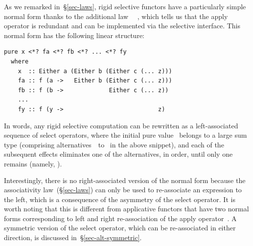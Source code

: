 As we remarked in~\S\ref{sec-laws}, rigid selective functors have a particularly
simple normal form thanks to the additional law \hs{(<*>)}~\hs{=}~,
which tells us that the apply operator \hs{<*>} is redundant and can be
implemented via the selective interface. This normal form has the following
linear structure:

\vspace{1mm}
\begin{verbatim}
pure x <*? fa <*? fb <*? ... <*? fy
  where
    x  :: Either a (Either b (Either c (... z)))
    fa :: f (a ->   Either b (Either c (... z)))
    fb :: f (b ->             Either c (... z))
    ...
    fy :: f (y ->                           z)
\end{verbatim}
\vspace{1mm}

\noindent
In words, any rigid selective computation can be rewritten as a left-associated
sequence of select operators, where the initial pure value~ belongs to a
large sum type (comprising alternatives~~to~ in the above snippet),
and each of the subsequent effects eliminates one of the alternatives, in order,
until only one remains (namely, ).

Interestingly, there is no right-associated version of the normal form because
the associativity law~(\S\ref{sec-laws}) can only be used to re-associate an
expression to the left, which is a consequence of the asymmetry of the select
operator. It is worth noting that this is different from applicative functors
that have two normal forms corresponding to left and right
re-association of the apply operator~\citep{free-applicatives}. A symmetric
version of the select operator, which can be re-associated in either direction,
is discussed in~\S\ref{sec-alt-symmetric}.



